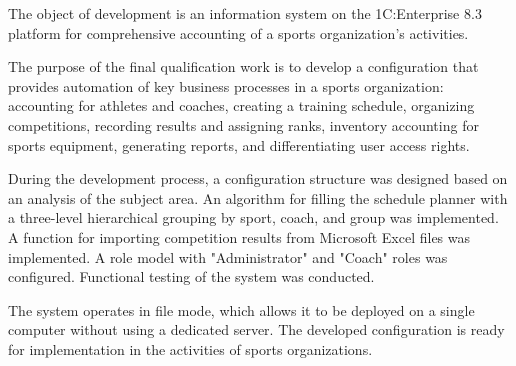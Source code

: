 The object of development is an information system on the 1C:Enterprise 8.3 platform for comprehensive accounting of a sports organization's activities.

The purpose of the final qualification work is to develop a configuration that provides automation of key business processes in a sports organization: accounting for athletes and coaches, creating a training schedule, organizing competitions, recording results and assigning ranks, inventory accounting for sports equipment, generating reports, and differentiating user access rights.

During the development process, a configuration structure was designed based on an analysis of the subject area. An algorithm for filling the schedule planner with a three-level hierarchical grouping by sport, coach, and group was implemented. A function for importing competition results from Microsoft Excel files was implemented. A role model with "Administrator" and "Coach" roles was configured. Functional testing of the system was conducted.

The system operates in file mode, which allows it to be deployed on a single computer without using a dedicated server. The developed configuration is ready for implementation in the activities of sports organizations.

